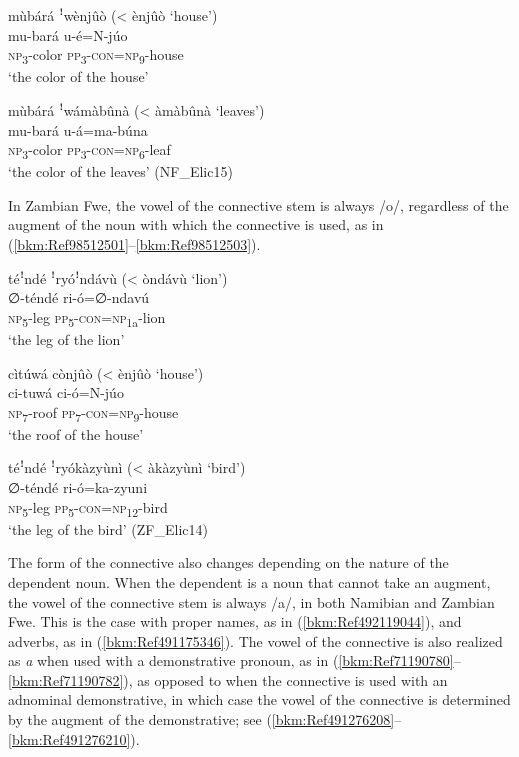 \ea
mùbárá ꜝwènjûò (< ènjûò ‘house’)\\
\gll mu-bará  u-é=N-júo\\
\textsc{np}\-\textsubscript{3}-color  \textsc{pp}\textsubscript{3}-\textsc{con}=\textsc{np}\textsubscript{9}-house\\
\glt ‘the color of the house’
\z

\ea
\label{bkm:Ref98512481}
mùbárá ꜝwámàbûnà (< àmàbûnà ‘leaves’)\\
\gll mu-bará  u-á=ma-búna\\
\textsc{np}\textsubscript{3}-color  \textsc{pp}\textsubscript{3}-\textsc{con}=\textsc{np}\textsubscript{6}-leaf\\
\glt ‘the color of the leaves’ (NF\_Elic15)
\z

In Zambian Fwe, the vowel of the connective stem is always /o/, regardless of the augment of the noun with which the connective is used, as in (\ref{bkm:Ref98512501}--\ref{bkm:Ref98512503}).

\ea
\label{bkm:Ref98512501}
téꜝndé ꜝryóꜝndávù (< òndávù ‘lion’)\\
\gll ∅-téndé  ri-ó=∅-ndavú\\
\textsc{np}\textsubscript{5}-leg  \textsc{pp}\textsubscript{5}-\textsc{con}=\textsc{np}\textsubscript{1a}-lion\\
\glt ‘the leg of the lion’
\z

\ea
cìtúwá cònjûò (< ènjûò ‘house’)\\
\gll ci-tuwá  ci-ó=N-júo\\
\textsc{np}\textsubscript{7}-roof  \textsc{pp}\textsubscript{7}-\textsc{con}=\textsc{np}\textsubscript{9}-house\\
\glt ‘the roof of the house’
\z

\ea
\label{bkm:Ref98512503}
téꜝndé ꜝryókàzyùnì (< àkàzyùnì ‘bird’)\\
\gll ∅-téndé  ri-ó=ka-zyuni\\
\textsc{np}\textsubscript{5}-leg  \textsc{pp}\textsubscript{5}-\textsc{con}=\textsc{np}\textsubscript{12}-bird\\
\glt ‘the leg of the bird’ (ZF\_Elic14)
\z

The form of the connective also changes depending on the nature of the dependent noun. When the dependent is a noun that cannot take an augment, the vowel of the connective stem is always /a/, in both Namibian and Zambian Fwe. This is the case with proper names, as in (\ref{bkm:Ref492119044}), and adverbs, as in (\ref{bkm:Ref491175346}). The vowel of the connective is also realized as \textit{a} when used with a demonstrative pronoun, as in (\ref{bkm:Ref71190780}--\ref{bkm:Ref71190782}), as opposed to when the connective is used with an adnominal demonstrative, in which case the vowel of the connective is determined by the augment of the demonstrative; see (\ref{bkm:Ref491276208}--\ref{bkm:Ref491276210}).

